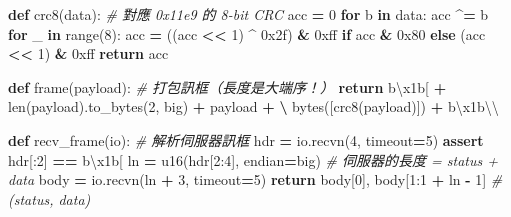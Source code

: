 \documentclass[10pt,a4paper]{article}
\newenvironment{Shaded}{\begin{snugshade}}{\end{snugshade}}
\newcommand{\BaseNTok}[1]{\textcolor[rgb]{0.00,0.00,0.81}{#1}}
\newcommand{\BuiltInTok}[1]{#1}
\newcommand{\CharTok}[1]{\textcolor[rgb]{0.31,0.60,0.02}{#1}}
\newcommand{\CommentTok}[1]{\textcolor[rgb]{0.56,0.35,0.01}{\textit{#1}}}
\newcommand{\ControlFlowTok}[1]{\textcolor[rgb]{0.13,0.29,0.53}{\textbf{#1}}}
\newcommand{\DecValTok}[1]{\textcolor[rgb]{0.00,0.00,0.81}{#1}}
\newcommand{\KeywordTok}[1]{\textcolor[rgb]{0.13,0.29,0.53}{\textbf{#1}}}
\newcommand{\NormalTok}[1]{#1}
\newcommand{\OperatorTok}[1]{\textcolor[rgb]{0.81,0.36,0.00}{\textbf{#1}}}
\newcommand{\StringTok}[1]{\textcolor[rgb]{0.31,0.60,0.02}{#1}}
\renewenvironment{Shaded}{%
  \def\FrameCommand{\fboxsep=3.2pt\colorbox{shadecolor}}%
  \MakeFramed{\advance\hsize-\width\FrameRestore\small}%
}{%
  \endMakeFramed
}
\begin{document}
\begin{Shaded}
\begin{Highlighting}[]
\KeywordTok{def}\NormalTok{ crc8(data):                       }\CommentTok{\# 對應 0x11e9 的 8{-}bit CRC}
\NormalTok{    acc }\OperatorTok{=} \DecValTok{0}
    \ControlFlowTok{for}\NormalTok{ b }\KeywordTok{in}\NormalTok{ data:}
\NormalTok{        acc }\OperatorTok{\^{}=}\NormalTok{ b}
        \ControlFlowTok{for}\NormalTok{ \_ }\KeywordTok{in} \BuiltInTok{range}\NormalTok{(}\DecValTok{8}\NormalTok{):}
\NormalTok{            acc }\OperatorTok{=}\NormalTok{ ((acc }\OperatorTok{\textless{}\textless{}} \DecValTok{1}\NormalTok{) }\OperatorTok{\^{}} \BaseNTok{0x2f}\NormalTok{) }\OperatorTok{\&} \BaseNTok{0xff} \ControlFlowTok{if}\NormalTok{ acc }\OperatorTok{\&} \BaseNTok{0x80} \ControlFlowTok{else}\NormalTok{ (acc }\OperatorTok{\textless{}\textless{}} \DecValTok{1}\NormalTok{) }\OperatorTok{\&} \BaseNTok{0xff}
    \ControlFlowTok{return}\NormalTok{ acc}

\KeywordTok{def}\NormalTok{ frame(payload):                   }\CommentTok{\# 打包訊框（長度是大端序！）}
    \ControlFlowTok{return} \StringTok{b\textquotesingle{}}\CharTok{\textbackslash{}x1b}\StringTok{[\textquotesingle{}} \OperatorTok{+} \BuiltInTok{len}\NormalTok{(payload).to\_bytes(}\DecValTok{2}\NormalTok{, }\StringTok{\textquotesingle{}big\textquotesingle{}}\NormalTok{) }\OperatorTok{+}\NormalTok{ payload }\OperatorTok{+} \OperatorTok{\textbackslash{}}
           \BuiltInTok{bytes}\NormalTok{([crc8(payload)]) }\OperatorTok{+} \StringTok{b\textquotesingle{}}\CharTok{\textbackslash{}x1b\textbackslash{}\textbackslash{}}\StringTok{\textquotesingle{}}

\KeywordTok{def}\NormalTok{ recv\_frame(io):                   }\CommentTok{\# 解析伺服器訊框}
\NormalTok{    hdr }\OperatorTok{=}\NormalTok{ io.recvn(}\DecValTok{4}\NormalTok{, timeout}\OperatorTok{=}\DecValTok{5}\NormalTok{)}
    \ControlFlowTok{assert}\NormalTok{ hdr[:}\DecValTok{2}\NormalTok{] }\OperatorTok{==} \StringTok{b\textquotesingle{}}\CharTok{\textbackslash{}x1b}\StringTok{[\textquotesingle{}}
\NormalTok{    ln }\OperatorTok{=}\NormalTok{ u16(hdr[}\DecValTok{2}\NormalTok{:}\DecValTok{4}\NormalTok{], endian}\OperatorTok{=}\StringTok{\textquotesingle{}big\textquotesingle{}}\NormalTok{)  }\CommentTok{\# 伺服器的長度 = status + data}
\NormalTok{    body }\OperatorTok{=}\NormalTok{ io.recvn(ln }\OperatorTok{+} \DecValTok{3}\NormalTok{, timeout}\OperatorTok{=}\DecValTok{5}\NormalTok{)}
    \ControlFlowTok{return}\NormalTok{ body[}\DecValTok{0}\NormalTok{], body[}\DecValTok{1}\NormalTok{:}\DecValTok{1} \OperatorTok{+}\NormalTok{ ln }\OperatorTok{{-}} \DecValTok{1}\NormalTok{]     }\CommentTok{\# (status, data)}


\end{Highlighting}
\end{Shaded}
\end{document}
